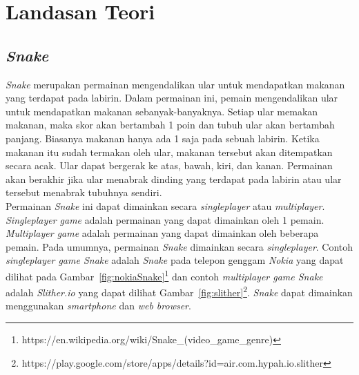 \chapter{Landasan Teori}
\label{chap:teori}



\section{\textit{Snake}}
\label{sec:snake}
\textit{Snake} merupakan permainan mengendalikan ular untuk mendapatkan makanan yang terdapat pada labirin. Dalam permainan ini, pemain mengendalikan ular untuk mendapatkan makanan sebanyak-banyaknya. Setiap ular memakan makanan, maka skor akan bertambah 1 poin dan tubuh ular akan bertambah panjang. Biasanya makanan hanya ada 1 saja pada sebuah labirin. Ketika makanan itu sudah termakan oleh ular, makanan tersebut akan ditempatkan secara acak. Ular dapat bergerak ke atas, bawah, kiri, dan kanan. Permainan akan berakhir jika ular menabrak dinding yang terdapat pada labirin atau ular tersebut menabrak tubuhnya sendiri. \\

Permainan \textit{Snake} ini dapat dimainkan secara \textit{singleplayer} atau \textit{multiplayer}. \textit{Singleplayer game} adalah permainan yang dapat dimainkan oleh 1 pemain. \textit{Multiplayer game} adalah permainan yang dapat dimainkan oleh beberapa pemain. Pada umumnya, permainan \textit{Snake} dimainkan secara \textit{singleplayer}. Contoh \textit{singleplayer game Snake} adalah \textit{Snake} pada telepon genggam \textit{Nokia} yang dapat dilihat pada Gambar~\ref{fig:nokiaSnake}\footnote{https://en.wikipedia.org/wiki/Snake\_(video\_game\_genre)} dan contoh \textit{multiplayer game Snake} adalah \textit{Slither.io} yang dapat dilihat Gambar~\ref{fig:slither}\footnote{https://play.google.com/store/apps/details?id=air.com.hypah.io.slither}. \textit{Snake} dapat dimainkan menggunakan \textit{smartphone} dan \textit{web browser}.  

